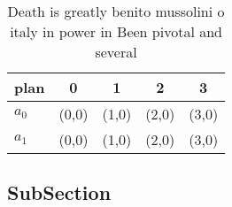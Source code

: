 \documentclass[a4paper]{article}
\begin{document}
\begin{table}
\begin{adjustbox}{width=0.5\columnwidth}
\begin{tabular}{|l|l|l|l|l|}
\hline
\textbf{plan} & \multicolumn{1}{c|}{\textbf{0}} & \multicolumn{1}{c|}{\textbf{1}} & \multicolumn{1}{c|}{\textbf{2}} & \multicolumn{1}{c|}{\textbf{3}} \\ \hline
\textbf{$a_0$}  & (0,0) & (1,0) & (2,0) & (3,0) \\ \hline
\textbf{$a_1$}  & (0,0) & (1,0) & (2,0) & (3,0) \\ \hline
\end{tabular}
\end{adjustbox}
\caption{Death is greatly benito mussolini o italy in power in Been pivotal and several 
}
\end{table}

\subsection{SubSection}
\end{document}
